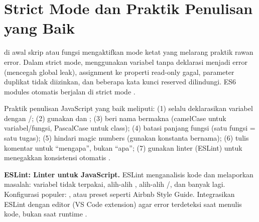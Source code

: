 \section{Strict Mode dan Praktik Penulisan yang Baik}

 di awal skrip atau fungsi mengaktifkan mode ketat yang melarang praktik rawan error. Dalam strict mode, menggunakan variabel tanpa deklarasi menjadi error (mencegah global leak), assignment ke properti read-only gagal, parameter duplikat tidak diizinkan, dan beberapa kata kunci reserved dilindungi. ES6 modules otomatis berjalan di strict mode \cite{jsInfo}.

Praktik penulisan JavaScript yang baik meliputi: (1) selalu deklarasikan variabel dengan /; (2) gunakan \code{===} dan \code{!==}; (3) beri nama bermakna (camelCase untuk variabel/fungsi, PascalCase untuk class); (4) batasi panjang fungsi (satu fungsi = satu tugas); (5) hindari magic numbers (gunakan konstanta bernama); (6) tulis komentar untuk ``mengapa'', bukan ``apa''; (7) gunakan linter (ESLint) untuk menegakkan konsistensi otomatis \cite{mdnJsGuide}.

\begin{konsep}
\textbf{ESLint: Linter untuk JavaScript.} ESLint menganalisis kode dan melaporkan masalah: variabel tidak terpakai, \code{==} alih-alih \code{===},  alih-alih /, dan banyak lagi. Konfigurasi populer: , atau preset seperti Airbnb Style Guide. Integrasikan ESLint dengan editor (VS Code extension) agar error terdeteksi saat menulis kode, bukan saat runtime \cite{mdnToolsTesting}.
\end{konsep}

